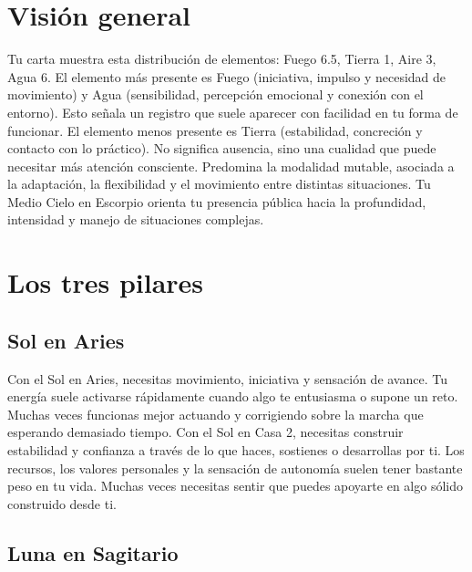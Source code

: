 \documentclass[11pt,a4paper]{article}
\begin{document}
\section{Visión general}

Tu carta muestra esta distribución de elementos: Fuego 6.5, Tierra 1, Aire 3, Agua 6. El elemento más presente es Fuego (iniciativa, impulso y necesidad de movimiento) y Agua (sensibilidad, percepción emocional y conexión con el entorno). Esto señala un registro que suele aparecer con facilidad en tu forma de funcionar. El elemento menos presente es Tierra (estabilidad, concreción y contacto con lo práctico). No significa ausencia, sino una cualidad que puede necesitar más atención consciente. Predomina la modalidad mutable, asociada a la adaptación, la flexibilidad y el movimiento entre distintas situaciones. Tu Medio Cielo en Escorpio orienta tu presencia pública hacia la profundidad, intensidad y manejo de situaciones complejas.

\vspace{0.8cm}


\section{Los tres pilares}

\subsection{Sol en Aries}

Con el Sol en Aries, necesitas movimiento, iniciativa y sensación de avance. Tu energía suele activarse rápidamente cuando algo te entusiasma o supone un reto. Muchas veces funcionas mejor actuando y corrigiendo sobre la marcha que esperando demasiado tiempo. Con el Sol en Casa 2, necesitas construir estabilidad y confianza a través de lo que haces, sostienes o desarrollas por ti. Los recursos, los valores personales y la sensación de autonomía suelen tener bastante peso en tu vida. Muchas veces necesitas sentir que puedes apoyarte en algo sólido construido desde ti.

\vspace{0.8cm}

\subsection{Luna en Sagitario}
\end{document}
